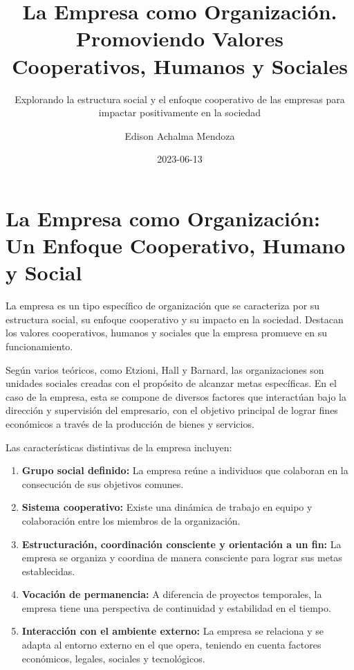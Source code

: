 \documentclass[
  letterpaper,
  DIV=11,
  numbers=noendperiod]{scrartcl}
\title{La Empresa como Organización. Promoviendo Valores Cooperativos,
Humanos y Sociales}
\subtitle{Explorando la estructura social y el enfoque cooperativo de
las empresas para impactar positivamente en la sociedad}
\author{Edison Achalma Mendoza}
\date{2023-06-13}
\begin{document}
\maketitle
\ifdefined\Shaded\renewenvironment{Shaded}{\begin{tcolorbox}[boxrule=0pt, enhanced, borderline west={3pt}{0pt}{shadecolor}, breakable, interior hidden, sharp corners, frame hidden]}{\end{tcolorbox}}\fi

\hypertarget{la-empresa-como-organizaciuxf3n-un-enfoque-cooperativo-humano-y-social}{%
\section{La Empresa como Organización: Un Enfoque Cooperativo, Humano y
Social}\label{la-empresa-como-organizaciuxf3n-un-enfoque-cooperativo-humano-y-social}}

La empresa es un tipo específico de organización que se caracteriza por
su estructura social, su enfoque cooperativo y su impacto en la
sociedad. Destacan los valores cooperativos, humanos y sociales que la
empresa promueve en su funcionamiento.

Según varios teóricos, como Etzioni, Hall y Barnard, las organizaciones
son unidades sociales creadas con el propósito de alcanzar metas
específicas. En el caso de la empresa, esta se compone de diversos
factores que interactúan bajo la dirección y supervisión del empresario,
con el objetivo principal de lograr fines económicos a través de la
producción de bienes y servicios.

Las características distintivas de la empresa incluyen:

\begin{enumerate}
\def\labelenumi{\arabic{enumi}.}
\item
  \textbf{Grupo social definido:} La empresa reúne a individuos que
  colaboran en la consecución de sus objetivos comunes.
\item
  \textbf{Sistema cooperativo:} Existe una dinámica de trabajo en equipo
  y colaboración entre los miembros de la organización.
\item
  \textbf{Estructuración, coordinación consciente y orientación a un
  fin:} La empresa se organiza y coordina de manera consciente para
  lograr sus metas establecidas.
\item
  \textbf{Vocación de permanencia:} A diferencia de proyectos
  temporales, la empresa tiene una perspectiva de continuidad y
  estabilidad en el tiempo.
\item
  \textbf{Interacción con el ambiente externo:} La empresa se relaciona
  y se adapta al entorno externo en el que opera, teniendo en cuenta
  factores económicos, legales, sociales y tecnológicos.
\end{enumerate}
\end{document}
